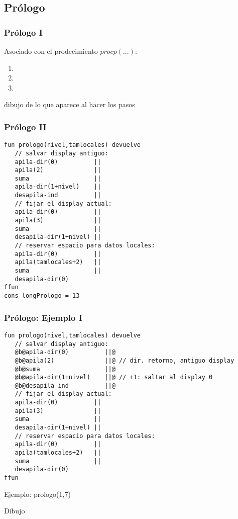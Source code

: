 \documentclass[hyperref={pdfpagelabels=false},tree-dvips]{beamer}
\begin{document}
\subsection{Prólogo}
\begin{frame}[fragile]
\frametitle{Prólogo I}

Asociado con el prodecimiento $proc p(...)$:
\begin{enumerate}[<+->]
	\item
	\item
	\item
\end{enumerate}

dibujo de lo que aparece al hacer los pasos

\end{frame}
\begin{frame}[fragile]
\frametitle{Prólogo II}

\begin{lstlisting}[style=codigoMP,basicstyle=\scriptsize\ttfamily]
fun prologo(nivel,tamlocales) devuelve
   // salvar display antiguo:
   apila-dir(0)          ||
   apila(2)              ||
   suma                  ||
   apila-dir(1+nivel)    ||
   desapila-ind          ||
   // fijar el display actual:
   apila-dir(0)          ||
   apila(3)              ||
   suma                  ||
   desapila-dir(1+nivel) ||
   // reservar espacio para datos locales:
   apila-dir(0)          ||
   apila(tamlocales+2)   ||
   suma                  ||
   desapila-dir(0)
ffun
cons longPrologo = 13
\end{lstlisting}


\end{frame}
\begin{frame}[fragile]
\frametitle{Prólogo: Ejemplo I}

\begin{lstlisting}[style=codigoMP,basicstyle=\tiny\ttfamily]
fun prologo(nivel,tamlocales) devuelve
   // salvar display antiguo:
   @b@apila-dir(0)          ||@
   @b@apila(2)              ||@ // dir. retorno, antiguo display
   @b@suma                  ||@
   @b@apila-dir(1+nivel)    ||@ // +1: saltar al display 0
   @b@desapila-ind          ||@
   // fijar el display actual:
   apila-dir(0)          ||
   apila(3)              ||
   suma                  ||
   desapila-dir(1+nivel) ||
   // reservar espacio para datos locales:
   apila-dir(0)          ||
   apila(tamlocales+2)   ||
   suma                  ||
   desapila-dir(0)
ffun
\end{lstlisting}

Ejemplo: prologo(1,7)

Dibujo

\end{frame}
\end{document}
